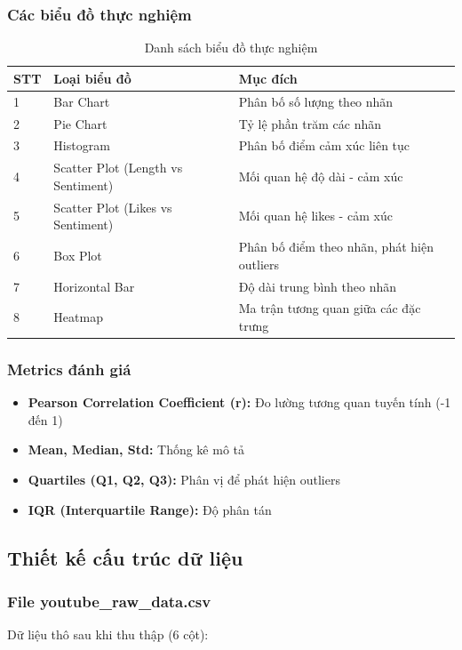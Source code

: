 \subsubsection{Các biểu đồ thực nghiệm}
\begin{table}[H]
\centering
\caption{Danh sách biểu đồ thực nghiệm}
\begin{tabular}{|l|l|p{6cm}|}
\hline
\textbf{STT} & \textbf{Loại biểu đồ} & \textbf{Mục đích} \\
\hline
1 & Bar Chart & Phân bố số lượng theo nhãn \\
\hline
2 & Pie Chart & Tỷ lệ phần trăm các nhãn \\
\hline
3 & Histogram & Phân bố điểm cảm xúc liên tục \\
\hline
4 & Scatter Plot (Length vs Sentiment) & Mối quan hệ độ dài - cảm xúc \\
\hline
5 & Scatter Plot (Likes vs Sentiment) & Mối quan hệ likes - cảm xúc \\
\hline
6 & Box Plot & Phân bố điểm theo nhãn, phát hiện outliers \\
\hline
7 & Horizontal Bar & Độ dài trung bình theo nhãn \\
\hline
8 & Heatmap & Ma trận tương quan giữa các đặc trưng \\
\hline
\end{tabular}
\end{table}

\subsubsection{Metrics đánh giá}
\begin{itemize}
    \item \textbf{Pearson Correlation Coefficient (r):} Đo lường tương quan tuyến tính (-1 đến 1)
    \item \textbf{Mean, Median, Std:} Thống kê mô tả
    \item \textbf{Quartiles (Q1, Q2, Q3):} Phân vị để phát hiện outliers
    \item \textbf{IQR (Interquartile Range):} Độ phân tán
\end{itemize}

\subsection{Thiết kế cấu trúc dữ liệu}

\subsubsection{File youtube\_raw\_data.csv}
Dữ liệu thô sau khi thu thập (6 cột):

